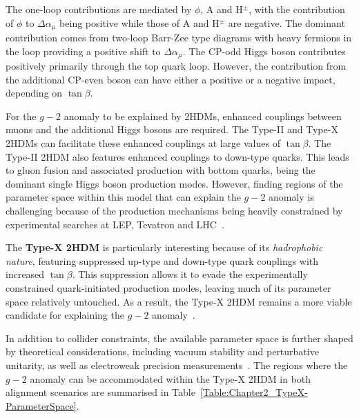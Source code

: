 The one-loop contributions are mediated by $\phi$, A and H$^{\pm}$, with the contribution of $\phi$ to $\Delta\alpha_\mu$ being positive while those of A and H$^{\pm}$ are negative. The dominant contribution comes from two-loop Barr-Zee type diagrams with heavy fermions in the loop providing a positive shift to $\Delta\alpha_\mu$. The CP-odd Higgs boson contributes positively primarily through the top quark loop. However, the contribution from the additional CP-even boson can have either a positive or a negative impact, depending on $\tan{\beta}$. 

For the $g-2$ anomaly to be explained by 2HDMs, enhanced couplings between muons and the additional Higgs bosons are required. The Type-II and Type-X 2HDMs can facilitate these enhanced couplings at large values of $\tan{\beta}$. The Type-II \ac{2HDM} also features enhanced couplings to down-type quarks. This leads to gluon fusion and associated production with bottom quarks, being the dominant single Higgs boson production modes. However, finding regions of the parameter space within this model that can explain the $g-2$ anomaly is challenging because of the production mechanisms being heavily constrained by experimental searches at \ac{LEP}, Tevatron and \ac{LHC}~\cite{TypeX_2HDM}.

The \textbf{Type-X \ac{2HDM}} is particularly interesting because of its \textit{hadrophobic nature}, featuring suppressed up-type and down-type quark couplings with increased $\tan{\beta}$. This suppression allows it to evade the experimentally constrained quark-initiated production modes, leaving much of its parameter space relatively untouched. As a result, the Type-X \ac{2HDM} remains a more viable candidate for explaining the $g-2$ anomaly~\cite{TypeX_2HDM}. 

In addition to collider constraints, the available parameter space is further shaped by theoretical considerations, including vacuum stability and perturbative unitarity, as well as electroweak precision measurements~\cite{TypeX_2HDM}. The regions where the $g-2$ anomaly can be accommodated within the Type-X \ac{2HDM} in both alignment scenarios are summarised in Table~\ref{Table:Chapter2_TypeX-ParameterSpace}.

